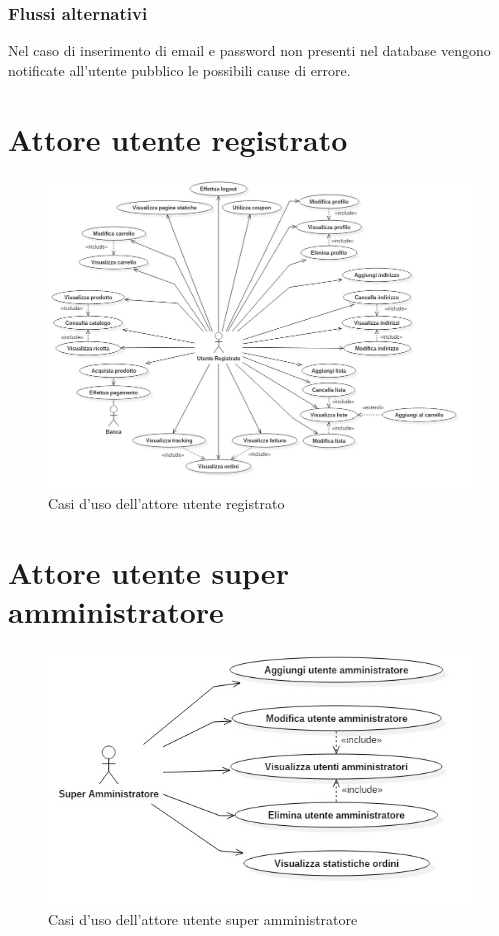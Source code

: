 	\subsubsection*{Flussi alternativi}
	Nel caso di inserimento di email e password non presenti nel database vengono notificate all'utente pubblico le possibili cause di errore.

\section{Attore utente registrato}
%
%
\begin{figure}[h]
	\centering
	\includegraphics[width=1\textwidth]
	{immagini/attore-utente-registrato}
	
	\caption{Casi d'uso dell'attore utente registrato}
\end{figure}

\section{Attore utente super amministratore}
%
%
\begin{figure}[h]
	\centering
	\includegraphics[width=1\textwidth]
	{immagini/attore-utente-super-amministratore}
	
	\caption{Casi d'uso dell'attore utente super amministratore}
\end{figure}

